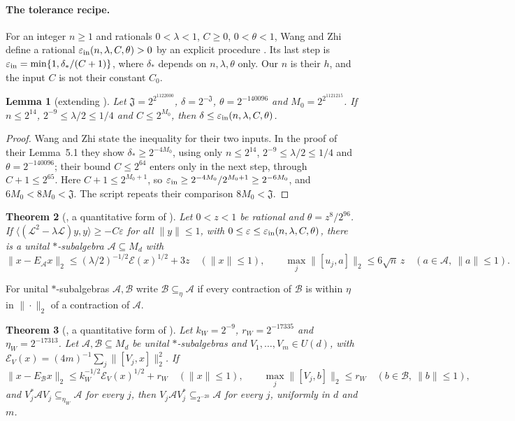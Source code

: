 \documentclass[11pt]{article}
\newtheorem{theorem}{Theorem}[section]
\newtheorem{lemma}[theorem]{Lemma}
\newcommand{\eps}{\varepsilon}
\newcommand{\cJ}{\mathfrak J}
\begin{document}
\paragraph{The tolerance recipe.}  For an integer $n\ge1$ and rationals $0<\lambda<1$, $C\ge0$, $0<\theta<1$, Wang and Zhi define a rational $\eps_{\rm in}(n,\lambda,C,\theta)>0$ by an explicit procedure \cite[Section~3.5, (3.21)--(3.22)]{WangZhi26}.  Its last step is $\eps_{\rm in}=\min\{1,\delta_*/(C+1)\}$, where $\delta_*$ depends on $n,\lambda,\theta$ only.  Our $n$ is their $h$, and the input $C$ is not their constant $C_0$.

\begin{lemma}[extending {\cite[Lemma~5.1]{WangZhi26}}]\label{lem:wz-tolerance}
Let $\cJ=2^{2^{1122000}}$, $\delta=2^{-\cJ}$, $\theta=2^{-140096}$ and $M_0=2^{2^{1121215}}$.  If $n\le2^{14}$, $2^{-9}\le\lambda/2\le1/4$ and $C\le2^{M_0}$, then $\delta\le\eps_{\rm in}(n,\lambda,C,\theta)$.
\end{lemma}
\begin{proof}
Wang and Zhi state the inequality for their two inputs.  In the proof of their Lemma~5.1 they show $\delta_*\ge2^{-4M_0}$, using only $n\le2^{14}$, $2^{-9}\le\lambda/2\le1/4$ and $\theta=2^{-140096}$; their bound $C\le2^{64}$ enters only in the next step, through $C+1\le2^{65}$.  Here $C+1\le2^{M_0+1}$, so $\eps_{\rm in}\ge2^{-4M_0}/2^{M_0+1}\ge2^{-6M_0}$, and $6M_0<8M_0<\cJ$.  The script  repeats their comparison $8M_0<\cJ$.
\end{proof}

\begin{theorem}[{\cite[Corollary~4.3]{WangZhi26}}, a quantitative form of {\cite[Theorems~4.3 and~5.2]{AlekseevLiuThom26}}]\label{thm:wz-commutant}
Let $0<z<1$ be rational and $\theta=z^8/2^{96}$.  If $\langle(\mathcal L^2-\lambda\mathcal L)y,y\rangle\ge-C\eps$ for all $\|y\|\le1$, with $0\le\eps\le\eps_{\rm in}(n,\lambda,C,\theta)$, there is a unital $*$-subalgebra $\mathcal A\subseteq M_d$ with
\[
 \|x-E_{\mathcal A}x\|_2\le(\lambda/2)^{-1/2}\mathcal E(x)^{1/2}+3z\quad(\|x\|\le1),\qquad \max_j\|[u_j,a]\|_2\le6\sqrt n\,z\quad(a\in\mathcal A,\ \|a\|\le1).
\]
\end{theorem}

For unital $*$-subalgebras $\mathcal A,\mathcal B$ write $\mathcal B\subseteq_\eta\mathcal A$ if every contraction of $\mathcal B$ is within $\eta$ in $\|\cdot\|_2$ of a contraction of $\mathcal A$.

\begin{theorem}[{\cite[Theorem~4.1]{WangZhi26}}, a quantitative form of {\cite[Theorem~4.2]{Thom26}}]\label{thm:reversal}
Let $k_W=2^{-9}$, $r_W=2^{-17335}$ and $\eta_W=2^{-17313}$.  Let $\mathcal A,\mathcal B\subseteq M_d$ be unital $*$-subalgebras and $V_1,\dots,V_m\in U(d)$, with $\mathcal E_V(x)=(4m)^{-1}\sum_j\|[V_j,x]\|_2^2$.  If
\[
 \|x-E_{\mathcal B}x\|_2\le k_W^{-1/2}\mathcal E_V(x)^{1/2}+r_W\quad(\|x\|\le1),\qquad \max_j\|[V_j,b]\|_2\le r_W\quad(b\in\mathcal B,\ \|b\|\le1),
\]
and $V_j^*\mathcal AV_j\subseteq_{\eta_W}\mathcal A$ for every $j$, then $V_j\mathcal AV_j^*\subseteq_{2^{-20}}\mathcal A$ for every $j$, uniformly in $d$ and $m$.
\end{theorem}
\end{document}
